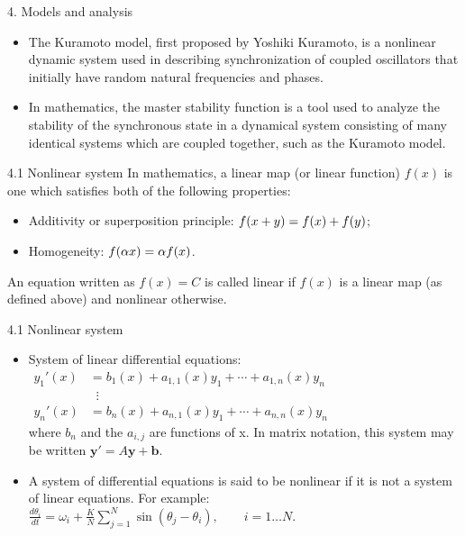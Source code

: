 \documentclass[
  notheorems,
  aspectratio=54,
]{beamer}
\begin{document}
\begin{frame}{4. Models and analysis}
  \begin{itemize}
    \item The Kuramoto model, first proposed by Yoshiki Kuramoto, is a nonlinear dynamic system used in describing synchronization of coupled oscillators that initially have random natural frequencies and phases.
    \item In mathematics, the master stability function is a tool used to analyze the stability of the synchronous state in a dynamical system consisting of many identical systems which are coupled together, such as the Kuramoto model.
  \end{itemize}
\end{frame}

\begin{frame}{4.1 Nonlinear system}
  In mathematics, a linear map (or linear function) $f(x)$ is one which satisfies both of the following properties:
  \begin{itemize}
    \item Additivity or superposition principle: ${\displaystyle \textstyle f(x+y)=f(x)+f(y)}$;
    \item Homogeneity: ${\displaystyle \textstyle f(\alpha x)=\alpha f(x)}$.
  \end{itemize}
  An equation written as $f(x)=C$ is called linear if $f(x)$ is a linear map (as defined above) and nonlinear otherwise.
\end{frame}

\begin{frame}{4.1 Nonlinear system}
  \begin{itemize}
    \item System of linear differential equations:
    ${\displaystyle {\begin{aligned}y_{1}'(x)&=b_{1}(x)+a_{1,1}(x)y_{1}+\cdots +a_{1,n}(x)y_{n}\\[1ex]&\;\;\vdots \\[1ex]y_{n}'(x)&=b_{n}(x)+a_{n,1}(x)y_{1}+\cdots +a_{n,n}(x)y_{n}\end{aligned}}}$
    \\ where $b_{n}$ and the $a_{i,j}$ are functions of x. In matrix notation, this system may be written
${\displaystyle \mathbf {y} '=A\mathbf {y} +\mathbf {b}}$.
    \item A system of differential equations is said to be nonlinear if it is not a system of linear equations. For example:
  \\\centering ${\frac  {d\theta _{i}}{dt}}=\omega _{i}+{\frac  {K}{N}}\sum _{{j=1}}^{{N}}\sin(\theta _{j}-\theta _{i}),\qquad i=1\ldots N$.
  \end{itemize}
\end{frame}
\end{document}
